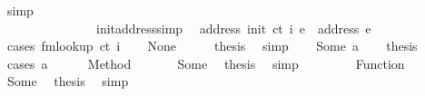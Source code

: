 \begin{isabellebody}
\ simp\isanewline
\ \ \ \ \ \ \ \ \ \ \ \ \ \ \ \ \isamarkupfalse%
\isanewline
\ \ \ \ \ \ \ \ \ \ \ \ \ \ \isamarkupfalse%
\isanewline
\ \ \ \ \ \ \ \ \ \ \ \ \isamarkupfalse%
\isanewline
\ \ \ \ \ \ \ \ \ \ \isamarkupfalse%
\isanewline
\ \ \ \ \ \ \ \ \isamarkupfalse%
\isanewline
\ \ \ \ \ \ \isamarkupfalse%
\isanewline
\ \ \ \ \isamarkupfalse%
\isanewline
\ \ \isamarkupfalse%
\isanewline
{}\isamarkupfalse%
%
\endisatagproof
{\isafoldproof}%
%
\isadelimproof
\isanewline
%
\endisadelimproof
\isanewline
{}\isamarkupfalse%
\ init{\isacharunderscore}{\kern0pt}address{\isacharbrackleft}{\kern0pt}simp{\isacharbrackright}{\kern0pt}{\isacharcolon}{\kern0pt}\isanewline
\ \ {\isachardoublequoteopen}address\ {\isacharparenleft}{\kern0pt}init\ ct\ i\ e{\isacharparenright}{\kern0pt}\ {\isacharequal}{\kern0pt}\ address\ e{\isachardoublequoteclose}\isanewline
%
\isadelimproof
%
\endisadelimproof
%
\isatagproof
{}\isamarkupfalse%
\ {\isacharparenleft}{\kern0pt}cases\ {\isachardoublequoteopen}fmlookup\ ct\ i{\isachardoublequoteclose}{\isacharparenright}{\kern0pt}\isanewline
\ \ \isamarkupfalse%
\ None\isanewline
\ \ \isamarkupfalse%
\ \isamarkupfalse%
\ {\isacharquery}{\kern0pt}thesis\ \isamarkupfalse%
\ simp\isanewline
{}\isamarkupfalse%
\isanewline
\ \ \isamarkupfalse%
\ {\isacharparenleft}{\kern0pt}Some\ a{\isacharparenright}{\kern0pt}\isanewline
\ \ \isamarkupfalse%
\ {\isacharquery}{\kern0pt}thesis\isanewline
\ \ \isamarkupfalse%
\ {\isacharparenleft}{\kern0pt}cases\ a{\isacharparenright}{\kern0pt}\isanewline
\ \ \ \ \isamarkupfalse%
\ {\isacharparenleft}{\kern0pt}Method\ {\isacharunderscore}{\kern0pt}{\isacharparenright}{\kern0pt}\isanewline
\ \ \ \ \isamarkupfalse%
\ Some\ \isamarkupfalse%
\ {\isacharquery}{\kern0pt}thesis\ \isamarkupfalse%
\ simp\isanewline
\ \ \isamarkupfalse%
\isanewline
\ \ \ \ \isamarkupfalse%
\ {\isacharparenleft}{\kern0pt}Function\ {\isacharunderscore}{\kern0pt}{\isacharparenright}{\kern0pt}\isanewline
\ \ \ \ \isamarkupfalse%
\ Some\ \isamarkupfalse%
\ {\isacharquery}{\kern0pt}thesis\ \isamarkupfalse%
\ simp\isanewline
\ \ \isamarkupfalse%
\isanewline
\ \ \ \ \isamarkupfalse%

\end{isabellebody}
